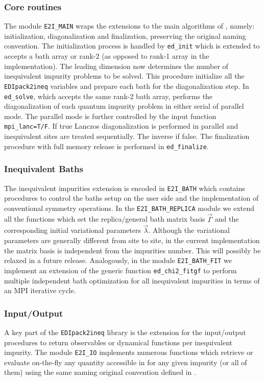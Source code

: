 \documentclass[edipack2.tex]{subfiles}
\begin{document}
\subsubsection{Core routines}\label{ssSecIneqGlobal}
The module {\tt E2I\_MAIN} wraps the extensions to the main algorithms
of \NAME, namely: initialization, diagonalization and finalization,
preserving the original naming convention.  
The initialization process is handled by {\tt ed\_init} which is
extended to accepts a bath array or rank-2 (as opposed to rank-1 array
in the \NAME implementation). The leading dimension now determines the
number of inequivalent impurity problems to be solved. This procedure
initialize all the {\tt EDIpack2ineq} variables and prepare each bath
for the diagonalization step. 
In {\tt ed\_solve}, which accepts the same rank-2 bath array, performs the
diagonalization of each quantum impurity problem in either serial of
parallel mode. The parallel mode is further controlled by the input
function {\tt mpi\_lanc=T/F}. If true Lanczos diagonalization is
performed in parallel and inequivalent sites are treated
sequentially. The inverse if false.   
The finalization procedure with full memory release is performed in
{\tt ed\_finalize}.





\subsubsection{Inequivalent Baths}\label{ssSecIneqBath}
The inequivalent impurities extension is encoded in {\tt E2I\_BATH}
which contains procedures to control the baths setup on the user side
and the  implementation of conventional symmetry operations.
In the {\tt E2I\_BATH\_REPLICA} module we extend all the functions
which set the replica/general bath matrix basis 
$\vec{\Gamma}$ and the corresponding initial variational parameters
$\vec{\lambda}$. Although the variational parameters are generally
different from site to site, in the current implementation the matrix
basis is independent from the impurities number. This will possibly be
relaxed in a future release. 
Analogously, in the module {\tt E2I\_BATH\_FIT} we implement an extension of the generic
function {\tt ed\_chi2\_fitgf} to perform multiple independent
bath optimization for all inequivalent impurities in terms of an MPI iterative cycle. 
 
\subsubsection{Input/Output}\label{ssSecIneqIO}
A key part of the {\tt EDIpack2ineq} library is the extension for the
input/output procedures to return observables or dynamical functions per inequivalent impurity.
The module {\tt E2I\_IO} implements numerous functions which retrieve
or evaluate on-the-fly any quantity accessible in \NAME for any given
impurity (or all of them) using the same naming original convention
defined in \NAME.       
\end{document}
